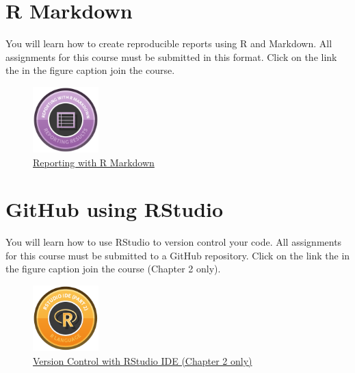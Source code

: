 \documentclass[letterpaper,9pt,twocolumn,twoside,printwatermark=false]{pinp}
\begin{document}
\section{R Markdown}\label{r-markdown}

You will learn how to create reproducible reports using R and Markdown.
All assignments for this course must be submitted in this format. Click
on the link the in the figure caption join the course.

\begin{figure}[H]
  \begin{center}
    \includegraphics[width=1in, height=1in]{../../images/rmarkdown_r.png} 
  \end{center}
  \caption{\href{https://www.datacamp.com/courses/reporting-with-r-markdown}{Reporting with R Markdown}}\label{fig}
\end{figure}

\section{GitHub using RStudio}\label{github-using-rstudio}

You will learn how to use RStudio to version control your code. All
assignments for this course must be submitted to a GitHub repository.
Click on the link the in the figure caption join the course (Chapter 2
only).

\begin{figure}[H]
  \begin{center}
    \includegraphics[width=1in, height=1in]{../../images/rstudio_ide_2.png} 
  \end{center}
  \caption{\href{https://www.datacamp.com/courses/working-with-the-rstudio-ide-part-2}{Version Control with RStudio IDE (Chapter 2 only)}}\label{fig}
\end{figure}





\end{document}
